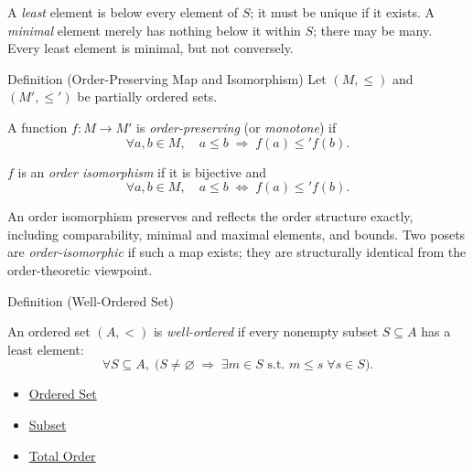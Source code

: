 \begin{remark*}
A \emph{least} element is below every element of $S$; it must be unique if it
exists. A \emph{minimal} element merely has nothing below it within $S$; there
may be many. Every least element is minimal, but not conversely.
\end{remark*}

\begin{propositionbox}{Definition (Order-Preserving Map and Isomorphism)}
\label{def:order-pres}
Let $(M,\leq)$ and $(M',\leq')$ be partially ordered sets.

A function $f : M \to M'$ is \emph{order-preserving} (or \emph{monotone}) if
\[
\forall a,b \in M,\quad a \leq b \;\Longrightarrow\; f(a) \leq' f(b).
\]

$f$ is an \emph{order isomorphism}\label{def:order-iso} if it is bijective and
\[
\forall a,b \in M,\quad a \leq b \;\Longleftrightarrow\; f(a) \leq' f(b).
\]
\end{propositionbox}

\begin{remark*}
An order isomorphism preserves and reflects the order structure exactly,
including comparability, minimal and maximal elements, and bounds. Two posets
are \emph{order-isomorphic} if such a map exists; they are structurally
identical from the order-theoretic viewpoint.
\end{remark*}

\begin{definitionbox}{Definition (Well-Ordered Set)}
\begin{definition}\label{def:well-order}
An ordered set $(A,<)$ is \emph{well-ordered} if every nonempty subset
$S \subseteq A$ has a least element:
\[
\forall S \subseteq A,\;
\bigl(S \neq \varnothing \;\Rightarrow\; \exists m \in S \text{ s.t.\ }
m \leq s \;\forall s \in S\bigr).
\]
\end{definition}
\end{definitionbox}

\begin{dependencies}
\begin{itemize}
  \item \hyperref[def:ordered-set]{Ordered Set}
  \item \hyperref[def:subset]{Subset}
  \item \hyperref[def:total-order]{Total Order}
\end{itemize}
\end{dependencies}


